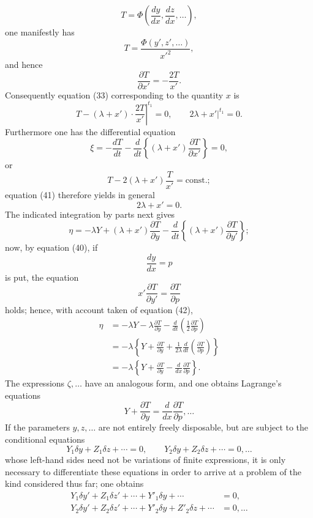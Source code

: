 \documentclass[11pt,a4paper,leqno]{article}
\begin{document}
\[
T=\Phi\left(\frac{dy}{dx},\frac{dz}{dx},\ldots\right),
\]
one manifestly has
\begin{equation}\tag{40}
T=\frac{\Phi(y',z',\ldots)}{x'^2},
\end{equation}
and hence
\[
\frac{\partial T}{\partial x'}=-\frac{2T}{x'}.
\]
Consequently equation (33) corresponding to the quantity $x$ is
\begin{equation}\tag{41}
\left.T-(\lambda+x')\cdot\frac{2T}{x'}\right|^{t_1}=0,\qquad
\left.2\lambda+x'\right|^{t_1}=0.
\end{equation}
Furthermore one has the differential equation
\[
\xi=-\frac{dT}{dt}-\frac{d}{dt}\left\{(\lambda+x')\frac{\partial T}{\partial x'}\right\}=0,
\]
or
\[
T-2(\lambda+x')\frac{T}{x'}=\mathrm{const.};
\]
equation (41) therefore yields in general
\begin{equation}\tag{42}
2\lambda+x'=0.
\end{equation}
The indicated integration by parts next gives
\[
\eta=-\lambda Y+(\lambda+x')\frac{\partial T}{\partial y}
-\frac{d}{dt}\left\{(\lambda+x')\frac{\partial T}{\partial y'}\right\};
\]
now, by equation (40), if
\[
\frac{dy}{dx}=p
\]
is put, the equation
\[
x'\frac{\partial T}{\partial y'}=\frac{\partial T}{\partial p}
\]
holds; hence, with account taken of equation (42),
\[
\begin{aligned}
\eta&=-\lambda Y-\lambda\frac{\partial T}{\partial y}
-\frac{d}{dt}\left(\frac12\frac{\partial T}{\partial p}\right)\\
&=-\lambda\left\{Y+\frac{\partial T}{\partial y}
+\frac{1}{2\lambda}\frac{d}{dt}\left(\frac{\partial T}{\partial p}\right)\right\}\\
&=-\lambda\left\{Y+\frac{\partial T}{\partial y}
-\frac{d}{dx}\frac{\partial T}{\partial p}\right\}.
\end{aligned}
\]
The expressions $\zeta,\ldots$ have an analogous form, and one obtains Lagrange's equations
\begin{equation}\tag{43}
Y+\frac{\partial T}{\partial y}=\frac{d}{dx}\frac{\partial T}{\partial p},\ldots
\end{equation}
If the parameters $y,z,\ldots$ are not entirely freely disposable, but are subject to the conditional equations
\[
Y_1\delta y+Z_1\delta z+\cdots=0,\qquad
Y_2\delta y+Z_2\delta z+\cdots=0,\ldots
\]
whose left-hand sides need not be variations of finite expressions, it is only necessary to differentiate these equations in order to arrive at a problem of the kind considered thus far; one obtains
\[
\begin{aligned}
Y_1\delta y'+Z_1\delta z'+\cdots+Y'_1\delta y+\cdots&=0,\\
Y_2\delta y'+Z_2\delta z'+\cdots+Y'_2\delta y+Z'_2\delta z+\cdots&=0,\ldots
\end{aligned}
\]
\end{document}
